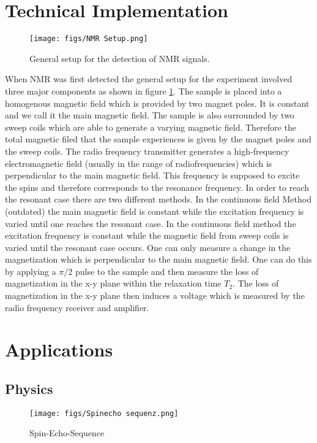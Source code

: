 \documentclass{article}
\begin{document}
\section{Technical Implementation}



\begin{figure}[h]
    \centering
    \texttt{[image: figs/NMR Setup.png]}
    \caption{General setup for the detection of NMR signals.}
    \label{fig:NMR setup}
\end{figure}
\FloatBarrier

When NMR was first detected the general setup for the experiment involved three major components as shown in figure \ref{fig:NMR setup}. The sample is placed into a homogenous magnetic field which is provided by two magnet poles. It is constant and we call it the main magnetic field. The sample is also surrounded by two sweep coils which are able to generate a varying magnetic field. Therefore the total magnetic filed that the sample experiences is given by the magnet poles and the sweep coils. The radio frequency transmitter generates a high-frequency electromagnetic field (usually in the range of radiofrequencies) which is perpendicular to the main magnetic field. This frequency is supposed to excite the spins and therefore corresponds to the resonance frequency. In order to reach the resonant case there are two different methods. In the continuous field Method (outdated) the main magnetic field is constant while the excitation frequency is varied until one reaches the resonant case. In the continuous field method the excitation frequency is constant while the magnetic field from sweep coils is varied until the resonant case occurs. 
One can only measure a change in the magnetization which is perpendicular to the main magnetic field. One can do this by applying a $\pi/2$ pulse to the sample and then measure the loss of magnetization in the x-y plane within the relaxation time $T_2$. The loss of magnetization in the x-y plane then induces a voltage which is measured by the radio frequency receiver and amplifier.



\section{Applications}
\subsection{Physics}
\begin{figure}[h]
    \centering
    \texttt{[image: figs/Spinecho sequenz.png]}
    \caption{Spin-Echo-Sequence}
    \label{fig:Spin-Echo}
\end{figure}
\FloatBarrier
\end{document}
